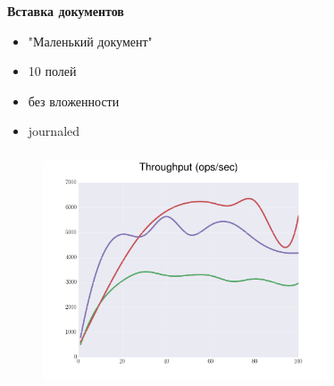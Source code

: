 \documentclass[usenames,dvipsnames, 18pt, compress, aspectratio=169]{beamer}
\begin{document}



\begin{frame}
    \frametitle{}
    \begin{center}
        \textbf{Вставка документов}
        \begin{itemize}[label={}]
            \item "Маленький документ"
            \item 10 полей
            \item без вложенности
            \item journaled
        \end{itemize}
    \end{center}
\end{frame}

\begin{frame}
    \frametitle{}
    \begin{center}
    \begin{figure}
        \includegraphics[width=0.75\textwidth,center]{benchmarks/load_data/throughput.png}
    \end{figure}
    \end{center}
\end{frame}
\end{document}
